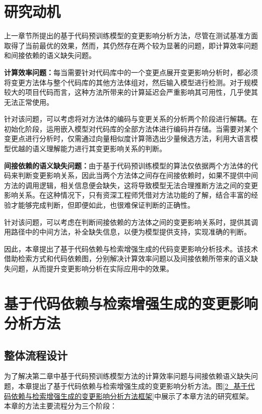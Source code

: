 \section{研究动机}

上一章节所提出的基于代码预训练模型的变更影响分析方法，尽管在测试基准方面取得了当前最优的效果，然而，其仍然存在两个较为显著的问题，即计算效率问题和间接依赖的语义缺失问题。

\textbf{计算效率问题：}每当需要针对代码库中的一个变更点展开变更影响分析时，都必须将变更方法体与整个代码库的其他方法体组对，然后输入模型进行检测。对于规模较大的项目代码而言，这种方法所带来的计算延迟会严重影响其可用性，几乎使其无法正常使用。

针对该问题，可以考虑将对方法体的编码与变更关系的分析两个阶段进行解耦。在初始化阶段，运用嵌入模型对代码库的全部方法体进行编码并存储。当需要对某个变更点进行分析时，仅需通过向量相似度计算筛选出少量候选方法，利用大语言模型优越的语义理解能力进行其变更影响关系的判断。

\textbf{间接依赖的语义缺失问题：}由于基于代码预训练模型的算法仅依据两个方法体的代码来判断变更影响关系，因此当两个方法体之间存在间接依赖时，如果不提供中间方法的调用逻辑，相关信息便会缺失，这将导致模型无法合理推断方法之间的变更影响关系。在这种情况下，只有资深工程师凭借对方法功能的了解，结合丰富的经验才能够完成判断，但即便如此，也很难保证判断的正确性。

针对该问题，可以考虑在判断间接依赖的方法体之间的变更影响关系时，提供其调用路径中的中间方法，补全缺失信息，以便为模型提供支持，实现准确的判断。

因此，本章提出了基于代码依赖与检索增强生成的代码变更影响分析技术。该技术借助检索方式和代码依赖图，分别解决计算效率问题以及间接依赖所带来的语义缺失问题，从而提升变更影响分析在实际应用中的效果。


\section{基于代码依赖与检索增强生成的变更影响分析方法}


\subsection{整体流程设计}

为了解决第二章中基于代码预训练模型方法的计算效率问题与间接依赖语义缺失问题，本章提出了基于代码依赖与检索增强生成的变更影响分析方法。图\ref{2_基于代码依赖与检索增强生成的变更影响分析方法框架}中展示了本章方法的研究框架。本章的方法主要流程分为三个阶段：

